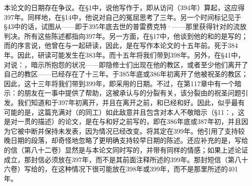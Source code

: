 本论文的日期存在争议。在§1中，说他写作于，即从访问（394年）算起，这应得397年。同样地，在§14中，他说对自己的冤屈思考了三年。另一个时间标记见于§43中的话，试图从——即于395年底去世的普雷费克特·——那里获得针对的流放判决。所有这些陈述都指向397年。另一方面，在§17中，他谈到他的和的是写的；而的序言说，他曾在与一起研读，因此，是在写作本论文的十五年前。死于384年。因此，研读可能发生在383年。而十五年将我们带到398年。另外，在§41中，对说：，暗示所抱怨的状况——即隐修士们出现在他的教区，或者至少他们离开了自己的教区——已经存在了十三年。于385年底或386年初离开了他被祝圣的教区；因此，这十三年将我们带到399年，即采用的日期。不过，在第117章中有一个暗示：的朋友在一事中提供了帮助，这被承认与的分裂有关，该分裂由的祝圣问题引发。我们知道和于397年初离开，并且在离开之前，和已经和好。因此，似乎最有可能的是，这篇充满对（的同工）如此敌意并且包含对本人不敬暗示（§11：，这是对一贯的描述）的论文，是在与和好之前写的，即在386年底或387年初，并且因为它被中断并保持未发表，因为情况已经改变。将其定在399年。他引用了支持较晚日期的段落，却奇怪地忽略了更明确支持较早日期的陈述。还应补充的是，写给的信（第八十二卷）显然是与本论文同时写的，并带有同样的情感；如果上述论证成立，那封信必须放在397年，而不是其前面注释所述的399年。那封短信（第八十六卷）写给的，在这种情况下很可能放在398年或399年，而不是那里所述的401年。\par

